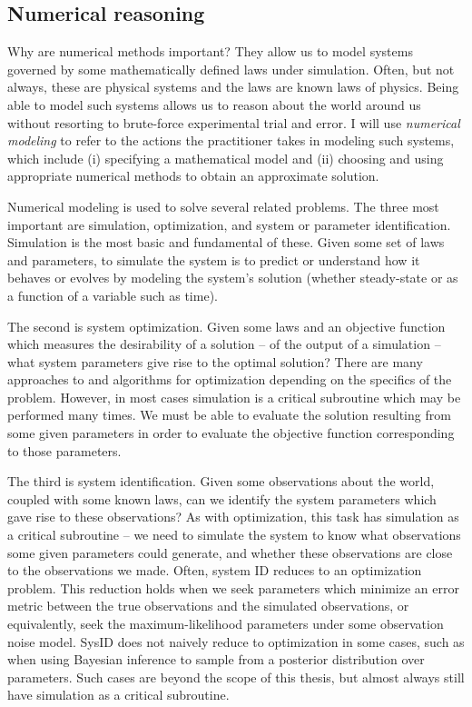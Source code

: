 \documentclass{puthesis}
\begin{document}
\subsection{Numerical reasoning}
Why are numerical methods important?
They allow us to model systems governed by some mathematically defined laws under simulation.
Often, but not always, these are physical systems and the laws are known laws of physics.
Being able to model such systems allows us to reason about the world around us without
resorting to brute-force experimental trial and error.
I will use \emph{numerical modeling} to refer to the actions the practitioner takes
in modeling such systems, which include (i) specifying a
mathematical model and (ii) choosing and using appropriate numerical methods to obtain an approximate solution.

Numerical modeling is used to solve several related problems.
The three most important are simulation, optimization, and system or parameter identification.
Simulation is the most basic and fundamental of these.
Given some set of laws and parameters, to simulate the system is to
predict or understand how it behaves or evolves by modeling the system's solution
(whether steady-state or as a function of a variable such as time).

The second is system optimization.
Given some laws and an objective function which
measures the desirability of a solution -- of the output of a simulation --
what system parameters give rise to the optimal solution?
There are many approaches to and algorithms for optimization depending on the specifics
of the problem.
However, in most cases simulation is a critical subroutine which may
be performed many times.
We must be able to evaluate the solution resulting from some given parameters
in order to evaluate the objective function corresponding to those parameters.

The third is system identification.
Given some observations about the world, coupled
with some known laws, can we identify the system parameters which gave rise to these
observations?
As with optimization, this task has simulation as a critical subroutine --
we need to simulate the system to know what observations some given parameters could
generate, and whether these observations are close to the observations we made.
Often, system ID reduces to an optimization problem.
This reduction holds when we seek parameters which minimize an error metric between
the true observations and the simulated observations, or equivalently, seek the
maximum-likelihood parameters under some observation noise model. SysID does not
naively reduce to optimization in some cases, such as when using Bayesian
inference to sample from a posterior distribution over parameters.
Such cases are beyond the scope of this thesis,
but almost always still have simulation as a critical subroutine.
\end{document}
